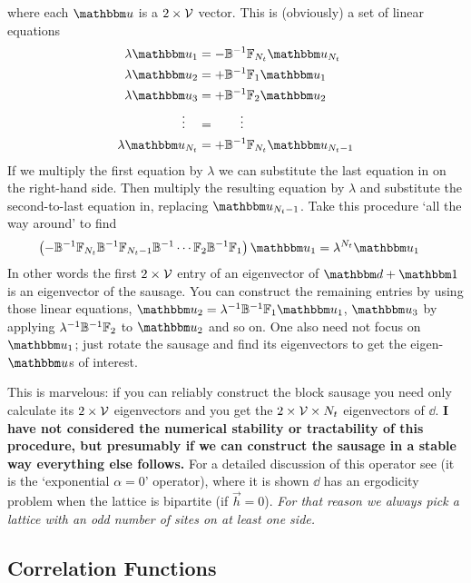 where each $\uu$ is a $2\times\mathcal{V}$ vector.
This is (obviously) a set of linear equations
\begin{align*}
	\lambda \uu_1 &= -\BB\inverse \FF_{N_t} \uu_{N_t}
    \\
	\lambda \uu_2 &=+\BB\inverse \FF_{1} \uu_{1}
    \\
	\lambda \uu_3 &= +\BB\inverse \FF_{2} \uu_{2}
    \\
    \vdots \quad &= \qquad \vdots
    \\
    \lambda \uu_{N_t} &= +\BB\inverse \FF_{N_t} \uu_{N_t-1}
\end{align*}
If we multiply the first equation by $\lambda$ we can substitute the last equation in on the right-hand side.
Then multiply the resulting equation by $\lambda$ and substitute the second-to-last equation in, replacing $\uu_{N_t-1}$.
Take this procedure `all the way around' to find
\begin{align}
    \left(-\BB\inverse \FF_{N_t} \BB\inverse \FF_{N_t-1} \BB\inverse \cdots \FF_2 \BB\inverse \FF_1 \right) \uu_1 &= \lambda^{N_t} \uu_1
\end{align}
In other words the first $2\times\mathcal{V}$ entry of an eigenvector of $\dd+\one$ is an eigenvector of the sausage.
You can construct the remaining entries by using those linear equations, $\uu_2 = \lambda\inverse\BB\inverse \FF_1 \uu_1$, $\uu_3$ by applying $\lambda^{-1} \mathbb{B}^{-1} \mathbb{F}_2$ to $\uu_2$ and so on.
One also need not focus on $\uu_1$; just rotate the sausage and find its eigenvectors to get the eigen-$\uu$s of interest.

This is marvelous: if you can reliably construct the block sausage you need only calculate its $2\times\mathcal{V}$ eigenvectors and you get the $2\times\mathcal{V}\times N_t$ eigenvectors of $\dd$.
{\bf I have not considered the numerical stability or tractability of this procedure, but presumably if we can construct the sausage in a stable way everything else follows.}
For a detailed discussion of this operator see  (it is the `exponential $\alpha=0$' operator), where it is shown $\dd$ has an ergodicity problem when the lattice is bipartite (if $\vec{h}=0$).
\emph{For that reason we always pick a lattice with an odd number of sites on at least one side.}

\subsection{Correlation Functions}

